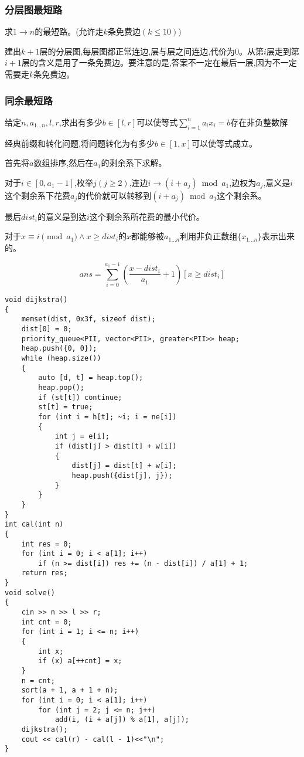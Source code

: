 \documentclass[a4paper, fontset=none]{ctexart}
\begin{document}
\subsubsection{分层图最短路}

求$1\rightarrow n$的最短路。(允许走$k$条免费边$(k\leqslant 10)$)

建出$k+1$层的分层图,每层图都正常连边,层与层之间连边,代价为0。从第$i$层走到第$i+1$层的含义是用了一条免费边。要注意的是,答案不一定在最后一层,因为不一定需要走$k$条免费边。
\subsubsection{同余最短路}

给定$n, a_{1\ldots n}, l, r$,求出有多少$b\in [l, r]$可以使等式$\sum\limits_{i=1}^n{a_ix_i}=b$存在非负整数解

经典前缀和转化问题,将问题转化为有多少$b\in [1, x]$可以使等式成立。

首先将$a$数组排序,然后在$a_1$的剩余系下求解。

对于$i\in [0, a_1-1]$,枚举$j(j\ge 2)$,连边$i\rightarrow (i+a_j)\bmod a_1$,边权为$a_j$,意义是$i$这个剩余系下花费$a_j$的代价就可以转移到$(i+a_j)\bmod a_1$这个剩余系。

最后$dist_i$的意义是到达$i$这个剩余系所花费的最小代价。

对于$x\equiv i\pmod{a_1}\wedge x\ge dist_i$的$x$都能够被$a_{1\ldots n}$利用非负正数组$\{x_{1\ldots n}\}$表示出来的。

\[ans=\sum\limits_{i=0}^{a_1-1}{(\frac{x-dist_i}{a_1}+1)[x\geqslant dist_i]}\]


\begin{verbatim}
void dijkstra()
{
    memset(dist, 0x3f, sizeof dist);
    dist[0] = 0;
    priority_queue<PII, vector<PII>, greater<PII>> heap;
    heap.push({0, 0});
    while (heap.size())
    {
        auto [d, t] = heap.top();
        heap.pop();
        if (st[t]) continue;
        st[t] = true;
        for (int i = h[t]; ~i; i = ne[i])
        {
            int j = e[i];
            if (dist[j] > dist[t] + w[i])
            {
                dist[j] = dist[t] + w[i];
                heap.push({dist[j], j});
            }
        }
    }
}
int cal(int n)
{
    int res = 0;
    for (int i = 0; i < a[1]; i++)
        if (n >= dist[i]) res += (n - dist[i]) / a[1] + 1;
    return res;
}
void solve()
{
    cin >> n >> l >> r;
    int cnt = 0;
    for (int i = 1; i <= n; i++)
    {
        int x;
        if (x) a[++cnt] = x;
    }
    n = cnt;
    sort(a + 1, a + 1 + n);
    for (int i = 0; i < a[1]; i++)
        for (int j = 2; j <= n; j++)
            add(i, (i + a[j]) % a[1], a[j]);
    dijkstra();
    cout << cal(r) - cal(l - 1)<<"\n";
}
\end{verbatim}
\end{document}
